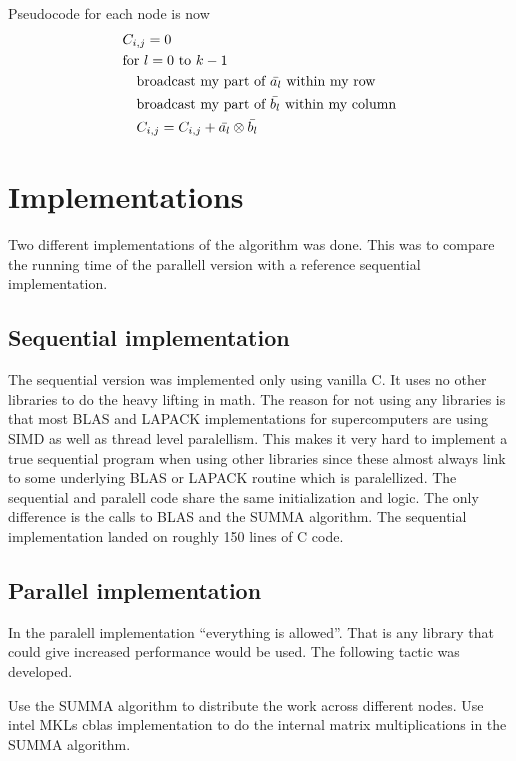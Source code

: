 \documentclass{article}
\begin{document}
Pseudocode for each node is now
\begin{align*}
  &C_{i,j} = 0\\
  &\text{for } l=0 \text{ to } k-1\\
  &\text{\enskip\enskip broadcast my part of } \bar{a_l} \text{ within my row}\\
  &\text{\enskip\enskip broadcast my part of } \bar{b_l} \text{ within my column}\\
  &\text{\enskip\enskip }C_{i,j} = C_{i,j} + \bar{a_l} \otimes \bar{b_l}\\
\end{align*}



\section{Implementations}
Two different implementations of the algorithm was done.
This was to compare the running time of the parallell version with a reference
sequential implementation.

\subsection{Sequential implementation}
The sequential version was implemented only using vanilla C. It uses no other libraries to
do the heavy lifting in math. The reason for not using any libraries is that most BLAS and LAPACK
implementations for supercomputers are using SIMD as well as thread level paralellism. This makes
it very hard to implement a true sequential program when using other libraries since these almost always
link to some underlying BLAS or LAPACK routine which is paralellized. The sequential and paralell code
share the same initialization and logic. The only difference is the calls to BLAS and the SUMMA algorithm.
The sequential implementation landed on roughly 150 lines of C code.

\subsection{Parallel implementation}
In the paralell implementation ``everything is allowed''. That is any library that could give
increased performance would be used. The following tactic was developed.

Use the SUMMA algorithm to distribute the work across different nodes. Use intel MKLs cblas implementation
to do the internal matrix multiplications in the SUMMA algorithm.
\end{document}
